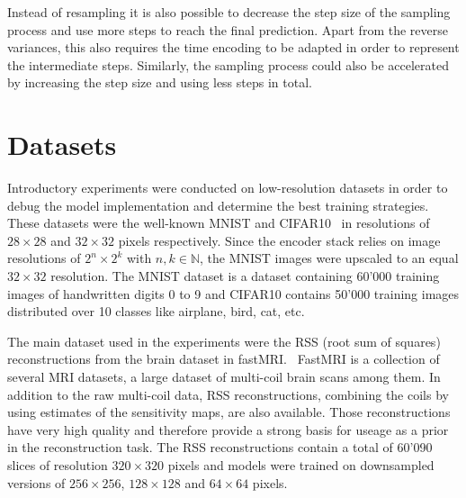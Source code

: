 Instead of resampling it is also possible to decrease the step size of the sampling process and use more steps to reach the final prediction. Apart from the reverse variances, this also requires the time encoding to be adapted in order to represent the intermediate steps. Similarly, the sampling process could also be accelerated by increasing the step size and using less steps in total.

\section{Datasets}
Introductory experiments were conducted on low-resolution datasets in order to debug the model implementation and determine the best training strategies. These datasets were the well-known MNIST and CIFAR10~\autocite{mnist,cifar} in resolutions of $28\times28$ and $32\times32$ pixels respectively. Since the encoder stack relies on image resolutions of $2^n\times2^k$ with $n,k\in \mathbb{N}$, the MNIST images were upscaled to an equal $32\times32$ resolution. The MNIST dataset is a dataset containing 60'000 training images of handwritten digits 0 to 9 and CIFAR10 contains 50'000 training images distributed over 10 classes like airplane, bird, cat, etc.

The main dataset used in the experiments were the RSS (root sum of squares) reconstructions from the brain dataset in fastMRI.~\autocite{zbontar2018fastMRI} FastMRI is a collection of several MRI datasets, a large dataset of multi-coil brain scans among them. In addition to the raw multi-coil data, RSS reconstructions, combining the coils by using estimates of the sensitivity maps, are also available. Those reconstructions have very high quality and therefore provide a strong basis for useage as a prior in the reconstruction task. The RSS reconstructions contain a total of 60'090 slices of resolution $320\times320$ pixels and models were trained on downsampled versions of $256\times 256$, $128\times 128$ and $64\times 64$ pixels.

